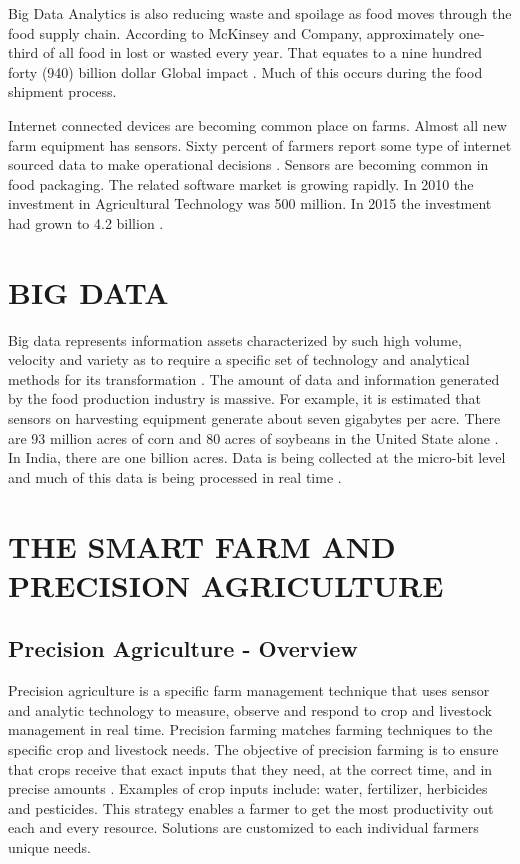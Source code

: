 \documentclass[sigconf]{acmart}
\begin{document}
Big Data Analytics is also reducing waste and spoilage as food moves through the food supply chain.  According to McKinsey and Company, approximately one-third of all food in lost or wasted every year.  That equates to a nine hundred forty (940) billion dollar Global impact \cite{www-google-bigdatatech}.  Much of this occurs during the food shipment process.  

Internet connected devices are becoming common place on farms. Almost all new farm equipment has sensors. Sixty percent of farmers report some type of internet sourced data to make operational decisions \cite{www-google-Farm}. Sensors are becoming common in food packaging.  The related software market is growing rapidly.  In 2010 the investment in Agricultural Technology was 500 million. In 2015 the investment had grown to 4.2 billion \cite{DevEcon}. 

\section{BIG DATA}

Big data represents information assets characterized by such high volume, velocity and variety as to require a specific set of technology and analytical methods for its transformation \cite{Wolfert}. The amount of data and information generated by the food production industry is massive. For example, it is estimated that sensors on harvesting equipment generate about seven gigabytes per acre. There are 93 million acres of corn and 80 acres of soybeans in the United State alone \cite{www-google-Farm}. In India, there are one billion acres. Data is being collected at the micro-bit level and much of this data is being processed in real time \cite{www-google-Crop}.  

\section{THE SMART FARM AND PRECISION AGRICULTURE}

\subsection{Precision Agriculture - Overview}

Precision agriculture is a specific farm management technique that uses sensor and analytic technology to measure, observe and respond to crop and livestock management in real time.  Precision farming matches farming techniques to the specific crop and livestock needs.  The objective of precision farming is to ensure that crops receive that exact inputs that they need, at the correct time, and in precise amounts \cite{www-google-Wikipedia}. Examples of crop inputs include: water, fertilizer, herbicides and pesticides.  This strategy enables a farmer to get the most productivity out each and every resource. Solutions are customized to each individual farmers unique needs.
\end{document}
